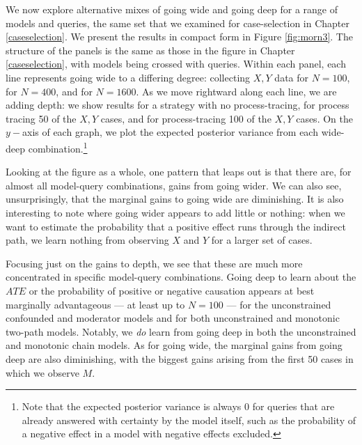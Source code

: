 \documentclass[
  12pt,
]{book}
\begin{document}
We now explore alternative mixes of going wide and going deep for a range of models and queries, the same set that we examined for case-selection in Chapter \ref{caseselection}. We present the results in compact form in Figure \ref{fig:morn3}. The structure of the panels is the same as those in the figure in Chapter \ref{caseselection}, with models being crossed with queries. Within each panel, each line represents going wide to a differing degree: collecting \(X,Y\) data for \(N=100\), for \(N=400\), and for \(N=1600\). As we move rightward along each line, we are adding depth: we show results for a strategy with no process-tracing, for process tracing 50 of the \(X,Y\) cases, and for process-tracing 100 of the \(X,Y\) cases. On the \(y-\)axis of each graph, we plot the expected posterior variance from each wide-deep combination.\footnote{Note that the expected posterior variance is always \(0\) for queries that are already answered with certainty by the model itself, such as the probability of a negative effect in a model with negative effects excluded.}

Looking at the figure as a whole, one pattern that leaps out is that there are, for almost all model-query combinations, gains from going wider. We can also see, unsurprisingly, that the marginal gains to going wide are diminishing. It is also interesting to note where going wider appears to add little or nothing: when we want to estimate the probability that a positive effect runs through the indirect path, we learn nothing from observing \(X\) and \(Y\) for a larger set of cases.

Focusing just on the gains to depth, we see that these are much more concentrated in specific model-query combinations. Going deep to learn about the \(ATE\) or the probability of positive or negative causation appears at best marginally advantageous --- at least up to \(N=100\) --- for the unconstrained confounded and moderator models and for both unconstrained and monotonic two-path models. Notably, we \emph{do} learn from going deep in both the unconstrained and monotonic chain models. As for going wide, the marginal gains from going deep are also diminishing, with the biggest gains arising from the first 50 cases in which we observe \(M\).
\end{document}
